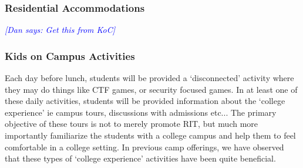 \documentclass[12pt]{article}
\newcommand{\dan}[1]{\textcolor{blue}{{\it [Dan says: #1]}}}
\begin{document}



\subsubsection{Residential Accommodations}
\dan{Get this from KoC}








\subsubsection{Kids on Campus Activities}




Each day before lunch, students will be provided a `disconnected' activity where they may do things like CTF games, or security focused games. In at least one of these daily activities, students will be provided information about the `college experience' ie campus tours, discussions with admissions etc... The primary objective of these tours is not to merely promote RIT, but much more importantly familiarize the students with a college campus and help them to feel comfortable in a college setting. In previous camp offerings, we have observed that these types of `college experience' activities have been quite beneficial.%
\end{document}
